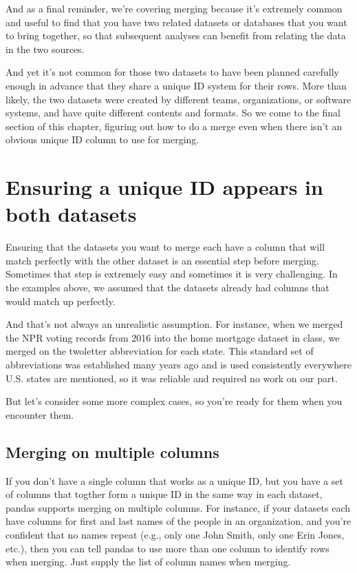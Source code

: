 \documentclass[letterpaper,10pt,english]{sphinxmanual}
\begin{document}
And as a final reminder, we’re covering merging because it’s extremely common and useful to find that you have two related datasets or databases that you want to bring together, so that subsequent analyses can benefit from relating the data in the two sources.

And yet it’s not common for those two datasets to have been planned carefully enough in advance that they share a unique ID system for their rows.  More than likely, the two datasets were created by different teams, organizations, or software systems, and have quite different contents and formats.  So we come to the final section of this chapter, figuring out how to do a merge even when there isn’t an obvious unique ID column to use for merging.


\section{Ensuring a unique ID appears in both datasets}
\label{\detokenize{chapter-12-concat-and-merge:ensuring-a-unique-id-appears-in-both-datasets}}
Ensuring that the datasets you want to merge each have a column that will match perfectly with the other dataset is an essential step before merging.  Sometimes that step is extremely easy and sometimes it is very challenging.  In the examples above, we assumed that the datasets already had columns that would match up perfectly.

And that’s not always an unrealistic assumption.  For instance, when we merged the NPR voting records from 2016 into the home mortgage dataset in class, we merged on the two\sphinxhyphen{}letter abbreviation for each state.  This standard set of abbreviations was established many years ago and is used consistently everywhere U.S. states are mentioned, so it was reliable and required no work on our part.

But let’s consider some more complex cases, so you’re ready for them when you encounter them.


\subsection{Merging on multiple columns}
\label{\detokenize{chapter-12-concat-and-merge:merging-on-multiple-columns}}
If you don’t have a single column that works as a unique ID, but you have a set of columns that togther form a unique ID in the same way in each dataset, pandas supports merging on multiple columns.  For instance, if your datasets each have columns for first and last names of the people in an organization, and you’re confident that no names repeat (e.g., only one John Smith, only one Erin Jones, etc.), then you can tell pandas to use more than one column to identify rows when merging.  Just supply the list of column names when merging.
\end{document}
